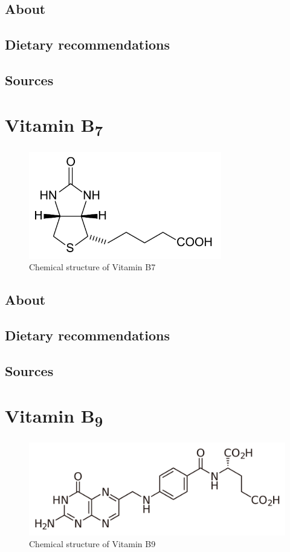 \documentclass{book}
\begin{document}
\section{About}


\section{Dietary recommendations}


\section{Sources}


\chapter{Vitamin B\textsubscript{7}}
\begin{figure}[h]
	\caption{Chemical structure of Vitamin B7}
	\centering \includegraphics[width=0.75\textwidth]{images/Vitamin_B7_chemical_structure}
\end{figure}
\newpage

\section{About}


\section{Dietary recommendations}


\section{Sources}


\chapter{Vitamin B\textsubscript{9}}
\begin{figure}[h]
	\caption{Chemical structure of Vitamin B9}
	\centering \includegraphics[width=\textwidth]{images/Vitamin_B9_chemical_structure}
\end{figure}
\newpage
\end{document}

